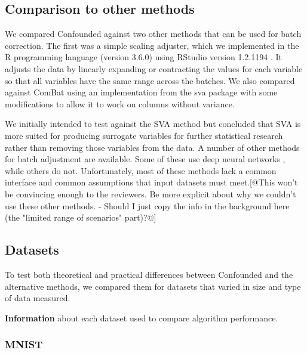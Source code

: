 \documentclass[11pt]{article}
\begin{document}
\subsection{Comparison to other methods}

We compared Confounded against two other methods that can be used for batch correction. The first was a simple scaling adjuster,
which we implemented in the R programming language (version 3.6.0) \citep{r_core_team_r_2014} using RStudio version 1.2.1194 \citep{rstudio_team_rstudio_2018}.
It adjusts the data by linearly expanding or contracting the values for each variable so that all variables have the same range across the batches.
We also compared against ComBat \citep{johnson_adjusting_2007} using an implementation from the sva package \citep{leek_sva_2017} with some modifications to allow it to work on columns without variance.

We initially intended to test against the SVA \citep{leek_capturing_2007} method but concluded that SVA is more suited for producing surrogate variables for further statistical research rather than removing those variables from the data.
A number of other methods for batch adjustment are available. Some of these use deep neural networks \citep{shaham_removal_2017,shaham_batch_2018,upadhyay_removal_2019}, while others do not\citep{espin-perez_comparison_2018}.
Unfortunately, most of these methods lack a common interface and common assumptions that input datasets must meet.[@This won't be convincing enough to the reviewers. Be more explicit about why we couldn't use these other methods. - Should I just copy the info in the background here (the "limited range of scenarios" part)?@]

\subsection{Datasets}

To test both theoretical and practical differences between Confounded and the alternative methods, we compared them for datasets that varied in size and type of data measured.

\begin{table}
	\centering
	\caption[Dataset information]{
		\textbf{Information} about each dataset used to compare algorithm performance.
	}
	
	\label{tab:datasets}
\end{table}

\subsubsection{MNIST}
\end{document}
